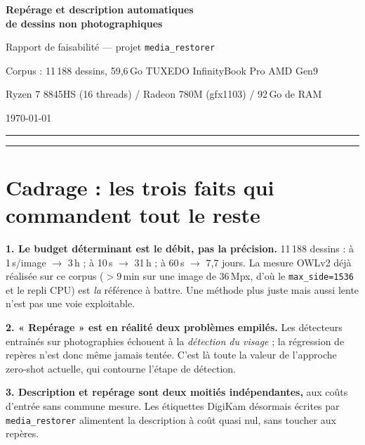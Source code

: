 \documentclass[11pt,a4paper]{article}
\newcommand{\aretenir}[1]{%
  \par\medskip
  \noindent\colorbox{encadre}{%
    \begin{minipage}{\dimexpr\linewidth-2\fboxsep}
      \vspace{2pt}#1\vspace{2pt}
    \end{minipage}}%
  \par\medskip
}
\begin{document}
\begin{center}
  {\LARGE\bfseries\color{accent} Repérage et description automatiques\\[2pt]
   de dessins non photographiques\par}
  \vspace{6pt}
  {\large Rapport de faisabilité — projet \texttt{media\_restorer}\par}
  \vspace{4pt}
  {\small Corpus : 11\,188 dessins, 59,6\,Go \textbullet{} TUXEDO InfinityBook Pro AMD Gen9\par}
  {\small Ryzen 7 8845HS (16 threads) / Radeon 780M (gfx1103) / 92\,Go de RAM\par}
  \vspace{2pt}
  {\small \today\par}
\end{center}

\vspace{4pt}
\hrule
\vspace{10pt}

\tableofcontents
\vspace{10pt}
\hrule

\section{Cadrage : les trois faits qui commandent tout le reste}

\aretenir{%
\textbf{1. Le budget déterminant est le débit, pas la précision.}
11\,188 dessins : à 1\,s/image $\rightarrow$ 3\,h ; à 10\,s $\rightarrow$ 31\,h ;
à 60\,s $\rightarrow$ 7,7 jours. La mesure OWLv2 déjà réalisée sur ce corpus
($>9$\,min sur une image de 36\,Mpx, d'où le \texttt{max\_side=1536} et le
repli CPU) est \emph{la} référence à battre. Une méthode plus juste mais aussi
lente n'est pas une voie exploitable.

\medskip
\textbf{2. « Repérage » est en réalité deux problèmes empilés.}
Les détecteurs entraînés sur photographies échouent à la \emph{détection du
visage} ; la régression de repères n'est donc même jamais tentée. C'est là
toute la valeur de l'approche zero-shot actuelle, qui contourne l'étape de
détection.

\medskip
\textbf{3. Description et repérage sont deux moitiés indépendantes,}
aux coûts d'entrée sans commune mesure. Les étiquettes DigiKam désormais
écrites par \texttt{media\_restorer} alimentent la description à coût quasi nul,
sans toucher aux repères.}
\end{document}
